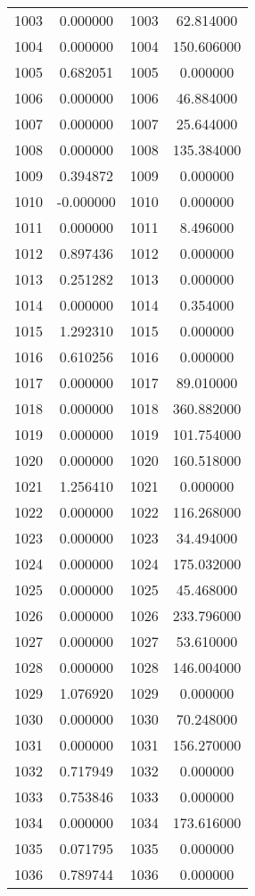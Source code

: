 \documentclass[12pt]{article}
\begin{document}
\begin{longtable}{@{}cccc@{}}
1003 & 0.000000 & 1003 & 62.814000 \\
1004 & 0.000000 & 1004 & 150.606000 \\
1005 & 0.682051 & 1005 & 0.000000 \\
1006 & 0.000000 & 1006 & 46.884000 \\
1007 & 0.000000 & 1007 & 25.644000 \\
1008 & 0.000000 & 1008 & 135.384000 \\
1009 & 0.394872 & 1009 & 0.000000 \\
1010 & -0.000000 & 1010 & 0.000000 \\
1011 & 0.000000 & 1011 & 8.496000 \\
1012 & 0.897436 & 1012 & 0.000000 \\
1013 & 0.251282 & 1013 & 0.000000 \\
1014 & 0.000000 & 1014 & 0.354000 \\
1015 & 1.292310 & 1015 & 0.000000 \\
1016 & 0.610256 & 1016 & 0.000000 \\
1017 & 0.000000 & 1017 & 89.010000 \\
1018 & 0.000000 & 1018 & 360.882000 \\
1019 & 0.000000 & 1019 & 101.754000 \\
1020 & 0.000000 & 1020 & 160.518000 \\
1021 & 1.256410 & 1021 & 0.000000 \\
1022 & 0.000000 & 1022 & 116.268000 \\
1023 & 0.000000 & 1023 & 34.494000 \\
1024 & 0.000000 & 1024 & 175.032000 \\
1025 & 0.000000 & 1025 & 45.468000 \\
1026 & 0.000000 & 1026 & 233.796000 \\
1027 & 0.000000 & 1027 & 53.610000 \\
1028 & 0.000000 & 1028 & 146.004000 \\
1029 & 1.076920 & 1029 & 0.000000 \\
1030 & 0.000000 & 1030 & 70.248000 \\
1031 & 0.000000 & 1031 & 156.270000 \\
1032 & 0.717949 & 1032 & 0.000000 \\
1033 & 0.753846 & 1033 & 0.000000 \\
1034 & 0.000000 & 1034 & 173.616000 \\
1035 & 0.071795 & 1035 & 0.000000 \\
1036 & 0.789744 & 1036 & 0.000000 \\

\end{longtable}
\end{document}
